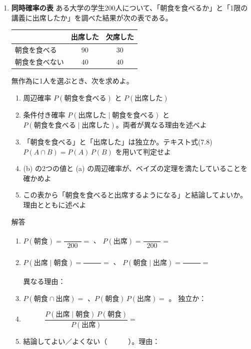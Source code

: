 \documentclass[a4paper,dvipdfmx]{jsarticle}
\newcommand{\提出期限}{2026年11月9日（月）}
\newcommand{\学籍番号}{0000000}
\newcommand{\氏名}{氏名を書く}
\newcommand{\提出日}{2026年11月9日}
\newenvironment{answer}{\begin{itembox}[l]{解答}}{\end{itembox}}
\begin{document}
\begin{enumerate}
  \item \textbf{同時確率の表}\quad
    ある大学の学生200人について、「朝食を食べるか」と「1限の講義に出席したか」を調べた結果が次の表である。
    \begin{center}
      \begin{tabular}{l|cc}
        \hline
         & 出席した & 欠席した \\
        \hline\hline
        朝食を食べる & $90$ & $30$ \\
        朝食を食べない & $40$ & $40$ \\
        \hline
      \end{tabular}
    \end{center}
    無作為に1人を選ぶとき、次を求めよ。
    \begin{enumerate}
      \item 周辺確率 $P(\text{朝食を食べる})$ と $P(\text{出席した})$
      \item 条件付き確率 $P(\text{出席した} \mid \text{朝食を食べる})$ と $P(\text{朝食を食べる} \mid \text{出席した})$。両者が異なる理由を述べよ
      \item 「朝食を食べる」と「出席した」は独立か。テキスト式(7.8) $P(A \cap B) = P(A)\,P(B)$ を用いて判定せよ
      \item (b) の2つの値と (a) の周辺確率が、ベイズの定理を満たしていることを確かめよ
      \item この表から「朝食を食べると出席するようになる」と結論してよいか。理由とともに述べよ
    \end{enumerate}
    \begin{answer}
      \begin{enumerate}
        \item $P(\text{朝食}) = \dfrac{\phantom{XXX}}{200} = $ \phantom{XXXX}、\quad
          $P(\text{出席}) = \dfrac{\phantom{XXX}}{200} = $ \phantom{XXXX}
          \vspace{4mm}
        \item $P(\text{出席} \mid \text{朝食}) = \dfrac{\phantom{XXX}}{\phantom{XXX}} = $ \phantom{XXXX}、\quad
          $P(\text{朝食} \mid \text{出席}) = \dfrac{\phantom{XXX}}{\phantom{XXX}} = $ \phantom{XXXX}
          \vspace{2mm}

          異なる理由：
          \vspace{10mm}
        \item $P(\text{朝食} \cap \text{出席}) = $ \phantom{XXXX}、$P(\text{朝食})\,P(\text{出席}) = $ \phantom{XXXX}。
          独立か：\phantom{XXXXXXXX}
          \vspace{4mm}
        \item
          \begin{equation*}
            \frac{P(\text{出席} \mid \text{朝食})\,P(\text{朝食})}{P(\text{出席})} = \phantom{XXXXXXXXXXXXXXXX}
          \end{equation*}
        \item 結論してよい／よくない（　　　）。理由：
          \vspace{14mm}
      \end{enumerate}
    \end{answer}


\end{enumerate}
\end{document}
